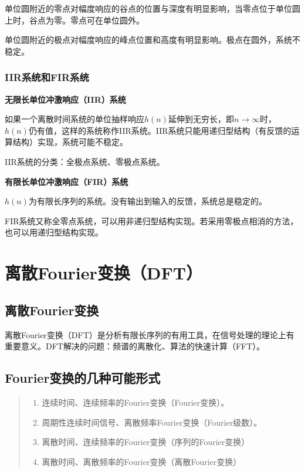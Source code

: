\documentclass[cn, hazy, blue, normal, 14pt]{elegantnote}
\begin{document}
单位圆附近的零点对幅度响应的谷点的位置与深度有明显影响，当零点位于单位圆上时，谷点为零。零点可在单位圆外。

单位圆附近的极点对幅度响应的峰点位置和高度有明显影响。极点在圆外，系统不稳定。

\subsubsection{IIR系统和FIR系统}

\textbf{无限长单位冲激响应（IIR）系统}

如果一个离散时间系统的单位抽样响应$h(n)$延伸到无穷长，即$n\rightarrow\infty$时，$h(n)$仍有值，这样的系统称作IIR系统。IIR系统只能用递归型结构（有反馈的运算结构）实现，系统可能不稳定。

IIR系统的分类：全极点系统、零极点系统。

\textbf{有限长单位冲激响应（FIR）系统}

$h(n)$为有限长序列的系统。没有输出到输入的反馈，系统总是稳定的。

FIR系统又称全零点系统，可以用非递归型结构实现。若采用零极点相消的方法，也可以用递归型结构实现。

\section{离散Fourier变换（DFT）}

\subsection{离散Fourier变换}

离散Fourier变换（DFT）是分析有限长序列的有用工具，在信号处理的理论上有重要意义。DFT解决的问题：频谱的离散化、算法的快速计算（FFT）。

\subsection{Fourier变换的几种可能形式}

\begin{quote}
\begin{enumerate}
    \item 连续时间、连续频率的Fourier变换（Fourier变换）。
    \item 周期性连续时间信号、离散频率Fourier变换（Fourier级数）。
    \item 离散时间、连续频率的Fourier变换（序列的Fourier变换）
    \item 离散时间、离散频率的Fourier变换（离散Fourier变换）
\end{enumerate}
\end{quote}
\end{document}
